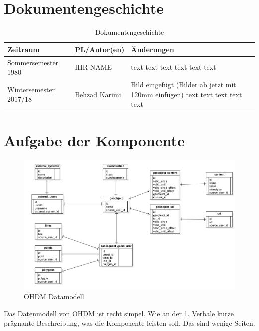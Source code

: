 \section{Dokumentengeschichte}
\begin{table}[h]
 \begin{tabular}{|l|l|p{4cm}|}
 \hline
 Zeitraum & PL/Autor(en) & Änderungen \\
 \hline
 Sommersemester 1980 & IHR NAME & 
text \newline 
text \newline 
text \newline 
text \newline 
text \newline 
text \newline 
 
  \\
 \hline
 Wintersemester 2017/18 & Behzad Karimi & 
Bild eingefügt (Bilder ab jetzt mit 120mm einfügen) \newline 
text \newline 
text \newline 
text \newline 
text \newline 
text \newline 
 
  \\
 \hline
 \end{tabular}
 \caption{Dokumentengeschichte}
 \end{table}

\section{Aufgabe der Komponente}
\begin{figure}[h!]
\centering
\includegraphics[width=120mm]{ohdm_datenmodell/ohdm_data_modell.jpg}
\caption{OHDM Datamodell}
\label{fig:datamodell}
\end{figure}
Das Datenmodell von OHDM ist recht simpel. Wie an der \cref{fig:datamodell}.
Verbale kurze prägnante Beschreibung, was die Komponente leisten soll.
Das sind wenige Seiten.

